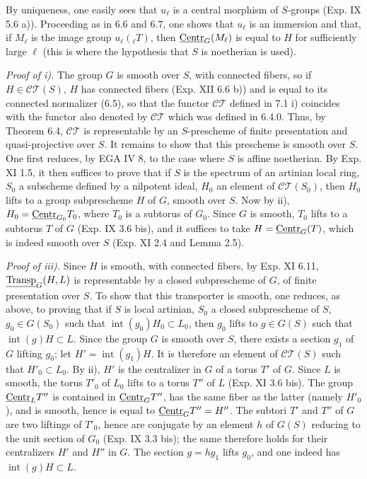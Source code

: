 By uniqueness, one easily sees that $u_\ell$ is a central morphism of $S$-groups (Exp. IX 5.6 a)). Proceeding as in 6.6 and 6.7, one shows that $u_\ell$ is an immersion and that, if $M_\ell$ is the image group $u_\ell({}_\ell T)$, then $\underline{\mathrm{Centr}}_G(M_\ell)$ is equal to $H$ for sufficiently large $\ell$ (this is where the hypothesis that $S$ is noetherian is used).

\par\noindent\emph{Proof of i).}
The group $G$ is smooth over $S$, with connected fibers, so if $H\in\mathscr{CT}(S)$, $H$ has connected fibers (Exp. XII 6.6 b)) and is equal to its connected normalizer (6.5), so that the functor $\mathscr{CT}$ defined in 7.1 i) coincides with the functor also denoted by $\mathscr{CT}$ which was defined in 6.4.0. Thus, by Theorem 6.4, $\mathscr{CT}$ is representable by an $S$-prescheme of finite presentation and quasi-projective over $S$. It remains to show that this prescheme is smooth over $S$. One first reduces, by EGA IV 8, to the case where $S$ is affine noetherian. By Exp. XI 1.5, it then suffices to prove that if $S$ is the spectrum of an artinian local ring, $S_0$ a subscheme defined by a nilpotent ideal, $H_0$ an element of $\mathscr{CT}(S_0)$, then $H_0$ lifts to a group subprescheme $H$ of $G$, smooth over $S$. Now by ii), $H_0=\underline{\mathrm{Centr}}_{G_0}T_0$, where $T_0$ is a subtorus of $G_0$. Since $G$ is smooth, $T_0$ lifts to a subtorus $T$ of $G$ (Exp. IX 3.6 bis), and it suffices to take $H=\underline{\mathrm{Centr}}_G(T)$, which is indeed smooth over $S$ (Exp. XI 2.4 and Lemma 2.5).

\par\noindent\emph{Proof of iii).}
Since $H$ is smooth, with connected fibers, by Exp. XI 6.11, $\underline{\operatorname{Transp}}_G(H,L)$ is representable by a closed subprescheme of $G$, of finite presentation over $S$. To show that this transporter is smooth, one reduces, as above, to proving that if $S$ is local artinian, $S_0$ a closed subprescheme of $S$, $g_0\in G(S_0)$ such that $\operatorname{int}(g_0)H_0\subset L_0$, then $g_0$ lifts to $g\in G(S)$ such that $\operatorname{int}(g)H\subset L$. Since the group $G$ is smooth over $S$, there exists a section $g_1$ of $G$ lifting $g_0$; let $H'=\operatorname{int}(g_1)H$. It is therefore an element of $\mathscr{CT}(S)$ such that $H'_0\subset L_0$. By ii), $H'$ is the centralizer in $G$ of a torus $T'$ of $G$. Since $L$ is smooth, the torus $T'_0$ of $L_0$ lifts to a torus $T''$ of $L$ (Exp. XI 3.6 bis). The group $\underline{\mathrm{Centr}}_L T''$ is contained in $\underline{\mathrm{Centr}}_G T''$, has the same fiber as the latter (namely $H'_0$), and is smooth, hence is equal to $\underline{\mathrm{Centr}}_G T''=H''$. The subtori $T'$ and $T''$ of $G$ are two liftings of $T'_0$, hence are conjugate by an element $h$ of $G(S)$ reducing to the unit section of $G_0$ (Exp. IX 3.3 bis); the same therefore holds for their centralizers $H'$ and $H''$ in $G$. The section $g=hg_1$ lifts $g_0$, and one indeed has $\operatorname{int}(g)H\subset L$.

